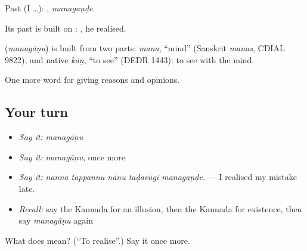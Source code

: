 Past (I …): , \emph{managaṇḍe}.

Its past is built on : , he realised.

\begin{cousinweb}
\textbf{} (\emph{managāṇu}) is built from two parts: \emph{mana}, \textquotedblleft{}mind\textquotedblright{} (Sanskrit \emph{manas}, CDIAL 9822), and native \emph{kāṇ}, \textquotedblleft{}to see\textquotedblright{} (DEDR 1443): to see with the mind.
\end{cousinweb}

\begin{grammarlens}[title={What you've built}]
One more word for giving reasons and opinions.
\end{grammarlens}

\subsection*{Your turn}
\begin{itemize}
\raggedright
  \item \emph{Say it:} \emph{managāṇu}
  \item \emph{Say it:} \emph{managāṇu}, once more
  \item \emph{Say it:} \emph{nanna tappannu nānu taḍavāgi managaṇḍe.} — I realised my mistake late.
  \item \emph{Recall:} say the Kannada for an illusion, then the Kannada for existence, then say \emph{managāṇu} again
\end{itemize}

\begin{tcolorbox}[breakable,colback=teal!4,colframe=teal!35!black,title={Before you move on}]
What does  mean? (\textquotedblleft{}To realise\textquotedblright{}.) Say it once more.
\end{tcolorbox}
